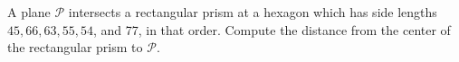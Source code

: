 A plane $\mathcal{P}$ intersects a rectangular prism at a hexagon which has side lengths $45,66,63,55,54$, and 77, in that order. Compute the distance from the center of the rectangular prism to $\mathcal{P}$.